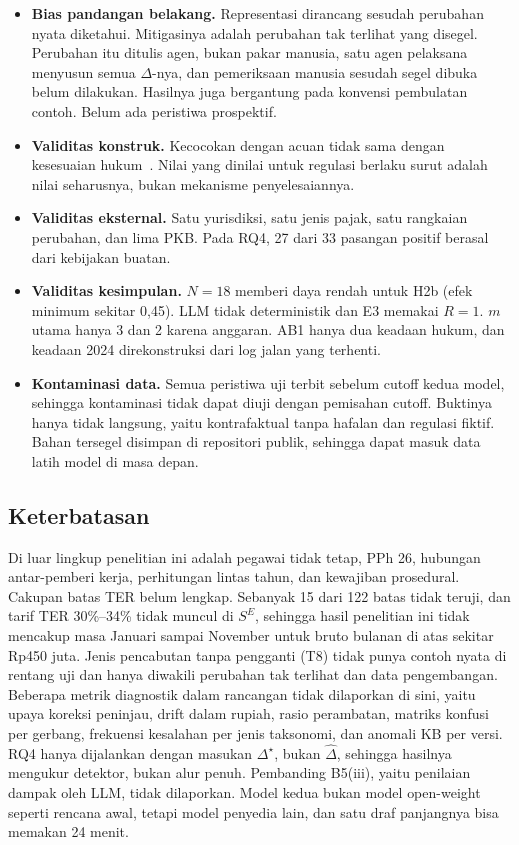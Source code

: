 \documentclass[conference]{IEEEtran}
\makeatletter
\DeclareRobustCommand{\en}[1]{{\usefont{\f@encoding}{\f@family}{\f@series}{it}#1\/}}
\newcommand{\emas}{\star}
\newcommand{\SE}{S^{E}}
\makeatother
\begin{document}
\begin{itemize}[leftmargin=*,nosep]
  \item \textbf{Bias pandangan belakang.} Representasi dirancang sesudah perubahan nyata diketahui. Mitigasinya adalah perubahan tak terlihat yang disegel. Perubahan itu ditulis agen, bukan pakar manusia, satu agen pelaksana menyusun semua $\Delta$-nya, dan pemeriksaan manusia sesudah segel dibuka belum dilakukan. Hasilnya juga bergantung pada konvensi pembulatan contoh. Belum ada peristiwa prospektif.
  \item \textbf{Validitas konstruk.} Kecocokan dengan acuan tidak sama dengan kesesuaian hukum~\cite{witt2024encoding}. Nilai yang dinilai untuk regulasi berlaku surut adalah nilai seharusnya, bukan mekanisme penyelesaiannya.
  \item \textbf{Validitas eksternal.} Satu yurisdiksi, satu jenis pajak, satu rangkaian perubahan, dan lima PKB. Pada RQ4, 27 dari 33 pasangan positif berasal dari kebijakan buatan.
  \item \textbf{Validitas kesimpulan.} $N = 18$ memberi daya rendah untuk H2b (efek minimum sekitar 0,45). LLM tidak deterministik dan E3 memakai $R = 1$. $m$ utama hanya 3 dan 2 karena anggaran. AB1 hanya dua keadaan hukum, dan keadaan 2024 direkonstruksi dari log jalan yang terhenti.
  \item \textbf{Kontaminasi data.} Semua peristiwa uji terbit sebelum \en{cutoff} kedua model, sehingga kontaminasi tidak dapat diuji dengan pemisahan \en{cutoff}. Buktinya hanya tidak langsung, yaitu kontrafaktual tanpa hafalan dan regulasi fiktif. Bahan tersegel disimpan di repositori publik, sehingga dapat masuk data latih model di masa depan.
\end{itemize}

\subsection{Keterbatasan}
\label{subsec:keterbatasan}
Di luar lingkup penelitian ini adalah pegawai tidak tetap, PPh 26, hubungan antar-pemberi kerja, perhitungan lintas tahun, dan kewajiban prosedural. Cakupan batas TER belum lengkap. Sebanyak 15 dari 122 batas tidak teruji, dan tarif TER 30\%--34\% tidak muncul di $\SE$, sehingga hasil penelitian ini tidak mencakup masa Januari sampai November untuk bruto bulanan di atas sekitar Rp450 juta. Jenis pencabutan tanpa pengganti (T8) tidak punya contoh nyata di rentang uji dan hanya diwakili perubahan tak terlihat dan data pengembangan. Beberapa metrik diagnostik dalam rancangan tidak dilaporkan di sini, yaitu upaya koreksi peninjau, \en{drift} dalam rupiah, rasio perambatan, matriks konfusi per gerbang, frekuensi kesalahan per jenis taksonomi, dan anomali KB per versi. RQ4 hanya dijalankan dengan masukan $\Delta^{\emas}$, bukan $\hat{\Delta}$, sehingga hasilnya mengukur detektor, bukan alur penuh. Pembanding B5(iii), yaitu penilaian dampak oleh LLM, tidak dilaporkan. Model kedua bukan model \en{open-weight} seperti rencana awal, tetapi model penyedia lain, dan satu draf panjangnya bisa memakan 24 menit.
\end{document}
